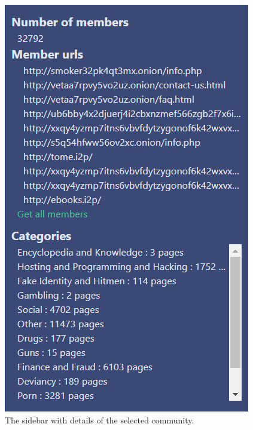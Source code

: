 \begin{figure}
  \begin{minipage}[t]{0.45\textwidth}
    \centering
    \includegraphics[width=\textwidth]{Images/community_sidebar.png}
    \caption{The sidebar with details of the selected community.}
   \label{sidebarCommunityDetails}
  \end{minipage} \hfill
  \begin{minipage}[t]{0.45\textwidth}
    \centering

\end{minipage}
\end{figure}
